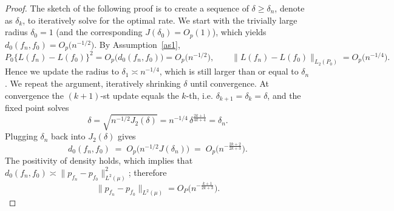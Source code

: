 \begin{proof}
The sketch of the following proof is to create a sequence of $\delta \geq \delta_n$, denote as $\delta_k$, to iteratively solve for the optimal rate. We start with the trivially large radius \(\delta_{0}=1\) (and the corresponding $J(\delta_0) = O_p(1)$), which yields  
\(
d_{0}(f_{n},f_{0}) = O_{p}\!\bigl(n^{-1/2}\bigr).
\)
By Assumption~\ref{as1},
\[
P_{0}\!\bigl\{L(f_{n})-L(f_{0})\bigr\}^{2}=O_{p}\!\bigl(d_{0}(f_{n},f_{0})\bigr)=O_{p}\!\bigl(n^{-1/2}\bigr),
\qquad
\bigl\lVert L(f_{n})-L(f_{0})\bigr\rVert_{L_{2}(P_{0})}
        =O_{p}\!\bigl(n^{-1/4}\bigr).
\]
Hence we update the radius to \(\delta_{1}\asymp n^{-1/4}\), which is still
larger than or equal to \(\delta_n\).
We repeat the argument, iteratively shrinking \(\delta\) until convergence.
At convergence the \((k+1)\)-st update equals the \(k\)-th, i.e. 
\(\delta_{k+1}=\delta_{k}=\delta\), and the fixed point solves
\[
\delta
=\sqrt{n^{-1/2}J_2(\delta)}
= n^{-1/4}\,\delta^{\frac{2k+1}{4k+4}}
=\delta_n.
\]
Plugging \(\delta_n\) back into \(J_2(\delta)\) gives
\[
d_{0}(f_{n},f_{0})
\;=\;
O_{p}\!\bigl(n^{-1/2}J(\delta_n)\bigr)
\;=\;
O_{p}\!\bigl(n^{-\frac{2k+2}{2k+3}}\bigr).
\]
The positivity of density holds, which implies that 
\(d_{0}(f_{n},f_{0})\asymp\lVert p_{f_{n}}-p_{f_{0}}\rVert_{L^{2}(\mu)}^{2}\);
therefore
\[
\lVert p_{f_{n}}-p_{f_{0}}\rVert_{L^{2}(\mu)}
=O_{P}\!\bigl(n^{-\frac{k+1}{2k+3}}\bigr).
\]

\end{proof}




